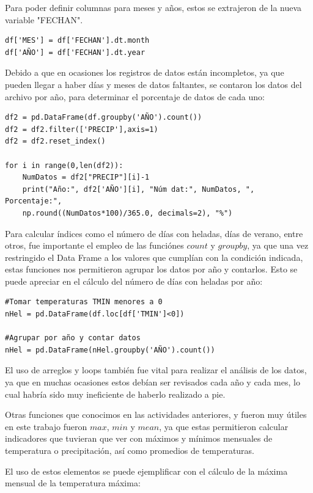 \documentclass[letterpaper,12pt]{article}
\begin{document}
Para poder definir columnas para meses y años, estos se extrajeron de la nueva variable "FECHAN".

\begin{verbatim}
df['MES'] = df['FECHAN'].dt.month
df['AÑO'] = df['FECHAN'].dt.year
\end{verbatim} 

Debido a que en ocasiones los registros de datos están incompletos, ya que pueden llegar a haber días y meses de datos faltantes, se contaron los datos del archivo por año, para determinar el porcentaje de datos de cada uno:

\begin{verbatim}
df2 = pd.DataFrame(df.groupby('AÑO').count())
df2 = df2.filter(['PRECIP'],axis=1)
df2 = df2.reset_index()

for i in range(0,len(df2)):
    NumDatos = df2["PRECIP"][i]-1
    print("Año:", df2['AÑO'][i], "Núm dat:", NumDatos, ", Porcentaje:",
    np.round((NumDatos*100)/365.0, decimals=2), "%")
\end{verbatim}

Para calcular índices como el número de días con heladas, días de verano, entre otros, fue importante el empleo de las funciónes $count$ y  $groupby$, ya que una vez restringido el Data Frame a los valores que cumplían con la condición indicada, estas funciones nos permitieron agrupar los datos por año y contarlos. Esto se puede apreciar en el cálculo del número de días con heladas por año:

\begin{verbatim}
#Tomar temperaturas TMIN menores a 0
nHel = pd.DataFrame(df.loc[df['TMIN']<0])

#Agrupar por año y contar datos 
nHel = pd.DataFrame(nHel.groupby('AÑO').count())
\end{verbatim}

El uso de arreglos y loops también fue vital para realizar el análisis de los datos, ya que en muchas ocasiones estos debían ser revisados cada año y cada mes, lo cual habría sido muy ineficiente de haberlo realizado a pie.

Otras funciones que conocimos en las actividades anteriores, y fueron muy útiles en este trabajo fueron $max$, $min$ y $mean$, ya que estas permitieron calcular indicadores que tuvieran que ver con máximos y mínimos mensuales de temperatura o precipitación, así como promedios de temperaturas. 

El uso de estos elementos se puede ejemplificar con el cálculo de la máxima mensual de la temperatura máxima:
\end{document}
